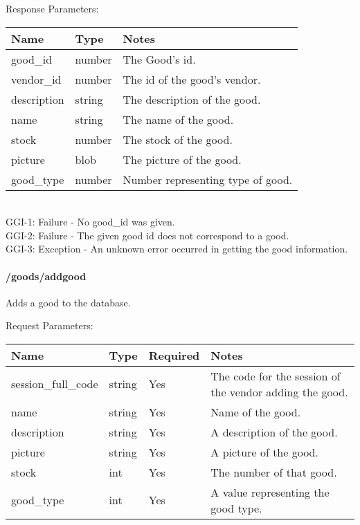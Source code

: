 \documentclass{article}[11pt]
\begin{document}
\noindent
Response Parameters: \\

\noindent
\begin{tabular}{|l|l|l|}
\hline
\textbf{Name} & \textbf{Type} & \textbf{Notes} \\
\hline
good\_id & number & The Good's id. \\
vendor\_id & number & The id of the good's vendor. \\
description & string & The description of the good. \\
name & string & The name of the good. \\
stock & number & The stock of the good. \\
picture & blob & The picture of the good. \\
good\_type & number & Number representing type of good. \\
\hline
\end{tabular} \\

\ErrorsSession
GGI-1: Failure - No good\_id was given. \\
GGI-2: Failure - The given good id does not correspond to a good. \\
GGI-3: Exception - An unknown error occurred in getting the good information. \\

\paragraph{/goods/addgood}\textbf{}

Adds a good to the database.

\noindent
Request Parameters:

\noindent
\begin{tabular}{|l|l|l|l|}
\hline
\textbf{Name} & \textbf{Type} & \textbf{Required} & \textbf{Notes} \\
\hline
session\_full\_code & string & Yes & The code for the session of the vendor adding the good. \\
name & string & Yes & Name of the good. \\
description & string & Yes & A description of the good. \\
picture & string & Yes & A picture of the good. \\
stock & int & Yes & The number of that good. \\
good\_type & int & Yes & A value representing the good type. \\
\hline
\end{tabular} \\
\end{document}
